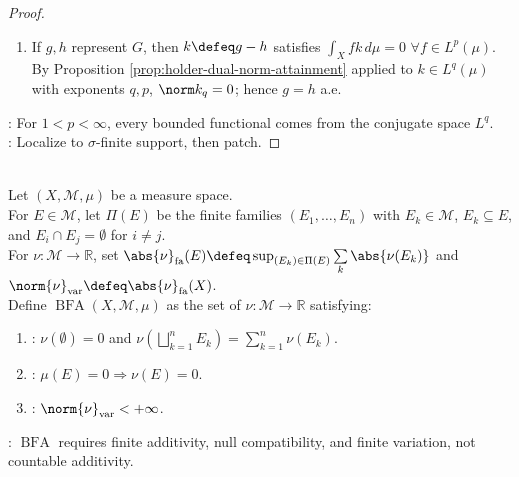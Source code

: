 \begin{theorem}
\begin{proof}
\begin{enumerate}[label=(\roman*)]
\item If $g,h$ represent $G$, then $k\defeq g-h$ satisfies $\int_Xfk\,d\mu=0$ $\forall f\in L^p(\mu)$.\\
By Proposition \ref{prop:holder-dual-norm-attainment} applied to $k\in L^q(\mu)$ with exponents $q,p$, $\norm k_q=0$; hence $g=h$ a.e.
\end{enumerate}
: For $1<p<\infty$, every bounded functional comes from the conjugate space $L^q$.\\
: Localize to $\sigma$-finite support, then patch.
\end{proof}
\end{theorem}

\begin{definition} \label{def:bfa-measures-linfty-dual} \\
Let $(X,\mathcal M,\mu)$ be a measure space.\\
For $E\in\mathcal M$, let $\Pi(E)$ be the finite families $(E_1,\ldots,E_n)$ with $E_k\in\mathcal M$, $E_k\subseteq E$, and $E_i\cap E_j=\emptyset$ for $i\neq j$.\\
For $\nu:\mathcal M\to\mathbb R$, set $\abs{\nu}_{\mathrm{fa}}(E)\defeq\sup_{(E_k)\in\Pi(E)}\sum\limits_k\abs{\nu(E_k)}$ and $\norm{\nu}_{\mathrm{var}}\defeq\abs{\nu}_{\mathrm{fa}}(X)$.\\
Define $\operatorname{BFA}(X,\mathcal M,\mu)$ as the set of $\nu:\mathcal M\to\mathbb R$ satisfying:
\begin{enumerate}[label=(\roman*)]
\setlength{\itemsep}{0pt}
\item {}: $\nu(\emptyset)=0$ and $\nu(\bigsqcup\limits_{k=1}^nE_k)=\sum\limits_{k=1}^n\nu(E_k)$.
\item {}: $\mu(E)=0\Rightarrow\nu(E)=0$.
\item {}: $\norm{\nu}_{\mathrm{var}}<+\infty$.
\end{enumerate}
: $\operatorname{BFA}$ requires finite additivity, null compatibility, and finite variation, not countable additivity.
\end{definition}

